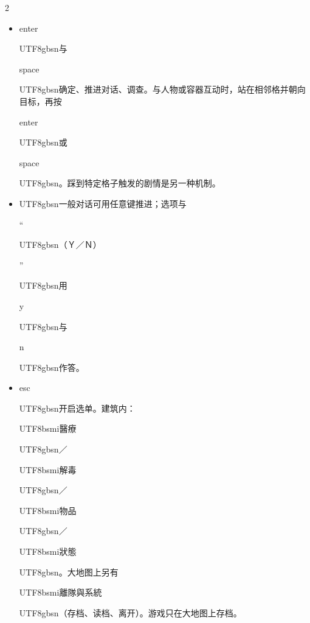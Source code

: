 \begin{paracol}{2}
\begin{itemize}[leftmargin=*,topsep=1pt,itemsep=0pt,parsep=0pt]\item enter \begin{CJK}{UTF8}{gbsn}与\end{CJK} space \begin{CJK}{UTF8}{gbsn}确定、推进对话、调查。与人物或容器互动时，站在相邻格并朝向目标，再按\end{CJK} enter \begin{CJK}{UTF8}{gbsn}或\end{CJK} space\begin{CJK}{UTF8}{gbsn}。踩到特定格子触发的剧情是另一种机制。\end{CJK}\item \begin{CJK}{UTF8}{gbsn}一般对话可用任意键推进；选项与\end{CJK}“\begin{CJK}{UTF8}{gbsn}（Ｙ／Ｎ）\end{CJK}”\begin{CJK}{UTF8}{gbsn}用\end{CJK} y \begin{CJK}{UTF8}{gbsn}与\end{CJK} n \begin{CJK}{UTF8}{gbsn}作答。\end{CJK}\item esc \begin{CJK}{UTF8}{gbsn}开启选单。建筑内：\end{CJK}\begin{CJK}{UTF8}{bsmi}醫療\end{CJK}\begin{CJK}{UTF8}{gbsn}／\end{CJK}\begin{CJK}{UTF8}{bsmi}解毒\end{CJK}\begin{CJK}{UTF8}{gbsn}／\end{CJK}\begin{CJK}{UTF8}{bsmi}物品\end{CJK}\begin{CJK}{UTF8}{gbsn}／\end{CJK}\begin{CJK}{UTF8}{bsmi}狀態\end{CJK}\begin{CJK}{UTF8}{gbsn}。大地图上另有\end{CJK}\begin{CJK}{UTF8}{bsmi}離隊與系統\end{CJK}\begin{CJK}{UTF8}{gbsn}（存档、读档、离开）。游戏只在大地图上存档。\end{CJK}\end{itemize}

\end{paracol}
